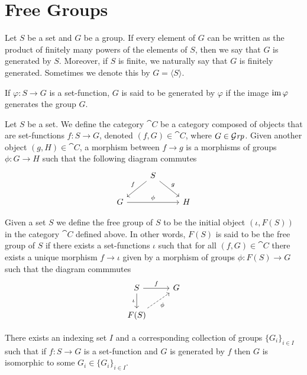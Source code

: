 \section{Free Groups}

\begin{definition}
  \label{def:group-generated}
  Let \(S\) be a set and \(G\) be a group. If every element of \(G\) can be
  written as the product of finitely many powers of the elements of \(S\), then
  we say that \(G\) is generated by \(S\). Moreover, if \(S\) is finite, we
  naturally say that \(G\) is finitely generated. Sometimes we denote this by
  \(G = \langle S \rangle\).

  If \(\varphi: S \to G\) is a set-function, \(G\) is said to be generated by \(\varphi\) if
  the image \(\operatorname{im} \varphi\) generates the group \(G\).
\end{definition}

Let \(S\) be a set. We define the category \(\cat C\) be a category composed of
objects that are set-functions \(f: S \to G\), denoted \((f, G) \in \cat C\), where
\(G \in {\mathcal{G}\textit{rp}}\). Given another object \((g, H) \in \cat C\), a morphism between \(f \to
g\) is a morphisms of groups \(\phi: G \to H\) such that the following diagram
commutes
\[
  \begin{tikzcd}
    &S \ar[dr, "g"] \ar[dl, swap, "f"] & \\
    G \ar[rr, "\phi"] & &H
  \end{tikzcd}
\]

\begin{definition}
  \label{def:free-group}
  Given a set \(S\) we define the free group of \(S\) to be the initial object
  \((\iota, F(S))\) in the category \(\cat C\) defined above. In other words,
  \(F(S)\) is said to be the free group of \(S\) if there exists a set-functions
  \(\iota\) such that for all \((f, G) \in \cat C\) there exists a unique morphism \(f
  \to \iota\) given by a morphism of groups \(\phi: F(S) \to G\) such that the diagram
  commmutes
  \[
    \begin{tikzcd}
      S \ar[d, swap, "\iota"] \ar[r, "f"] & G \\
      F(S) \ar[ur, dashed, swap, "\phi"] &
    \end{tikzcd}
  \]
\end{definition}

\begin{lemma}
  \label{lem:isomorphism-indexing-set-group}
  There exists an indexing set \(I\) and a corresponding collection of groups
  \(\{G_{i}\}_{i \in I}\) such that if \(f: S \to G\) is a set-function and \(G\) is
  generated by \(f\) then \(G\) is isomorphic to some \(G_i \in \{G_{i}\}_{i \in I}\).
\end{lemma}

